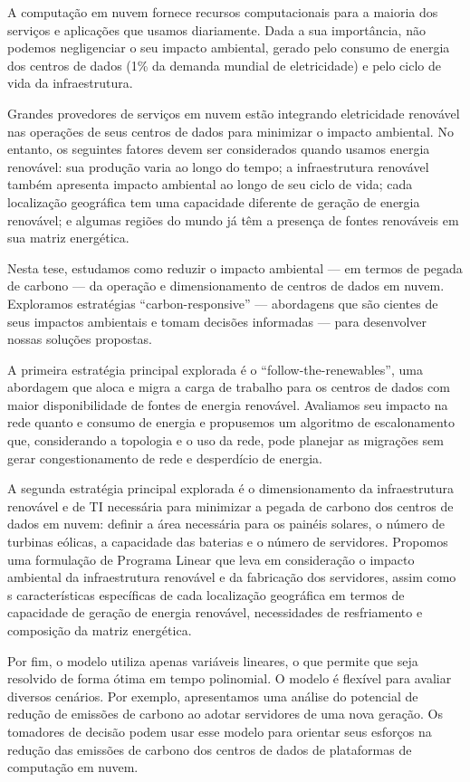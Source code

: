 
A computação em nuvem fornece recursos computacionais para a maioria dos serviços e aplicações que usamos diariamente. Dada a sua importância, não podemos negligenciar o seu impacto ambiental, gerado pelo consumo de energia dos centros de dados (1\% da demanda mundial de eletricidade) e pelo ciclo de vida da infraestrutura.


Grandes provedores de serviços em nuvem estão integrando eletricidade renovável nas operações de seus centros de dados para minimizar o impacto ambiental. No entanto, os seguintes fatores devem ser considerados quando usamos energia renovável: sua produção varia ao longo do tempo; a infraestrutura renovável também apresenta impacto ambiental ao longo de seu ciclo de vida; cada localização geográfica tem uma capacidade diferente de geração de energia renovável; e algumas regiões do mundo já têm a presença de fontes renováveis em sua matriz energética.


Nesta tese, estudamos como reduzir o impacto ambiental --- em termos de pegada de carbono --- da operação e dimensionamento de centros de dados em nuvem. Exploramos estratégias ``carbon-responsive'' --- abordagens que são cientes de seus impactos ambientais e tomam decisões informadas --- para desenvolver nossas soluções propostas.

A primeira estratégia principal explorada é o ``follow-the-renewables'', uma abordagem que aloca e migra a carga de trabalho para os centros de dados com maior disponibilidade de fontes de energia renovável. Avaliamos seu impacto na rede quanto e consumo de energia e propusemos um algoritmo de escalonamento que, considerando a topologia  e o uso da rede, pode planejar as migrações sem gerar congestionamento de rede e desperdício de energia.

A segunda estratégia principal explorada é o dimensionamento da infraestrutura renovável e de TI necessária para minimizar a pegada de carbono dos centros de dados em nuvem: definir a área necessária para os painéis solares, o número de turbinas eólicas, a capacidade das baterias e o número de servidores. Propomos uma formulação de Programa Linear que leva em consideração o impacto ambiental da infraestrutura renovável e da fabricação dos servidores, assim como s características específicas de cada localização geográfica em termos de capacidade de geração de energia renovável, necessidades de resfriamento e composição da matriz energética. 

Por fim, o modelo utiliza apenas variáveis lineares, o que permite que seja resolvido de forma ótima em tempo polinomial. O modelo é flexível para avaliar diversos cenários. Por exemplo, apresentamos uma análise do potencial de redução de emissões de carbono ao adotar servidores de uma nova geração. Os tomadores de decisão podem usar esse modelo para orientar seus esforços na redução das emissões de carbono dos centros de dados de plataformas de computação em nuvem.





